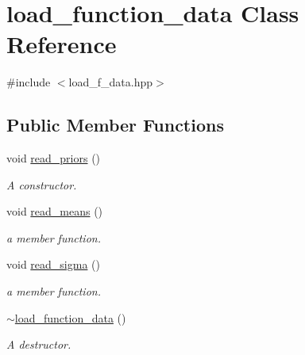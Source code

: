 \hypertarget{classload__function__data}{\section{load\-\_\-function\-\_\-data \-Class \-Reference}
\label{classload__function__data}
}


{\ttfamily \#include $<$load\-\_\-f\-\_\-data.\-hpp$>$}

\subsection*{\-Public \-Member \-Functions}
\begin{DoxyCompactItemize}
\item 
void \hyperlink{classload__function__data_a642d59527bc9b92f3a7133f286b2a586}{read\-\_\-priors} ()
\begin{DoxyCompactList}\small\item\em \-A constructor. \end{DoxyCompactList}\item 
\hypertarget{classload__function__data_a71a30364a1c8cb22ea6219d7738eb7bb}{void \hyperlink{classload__function__data_a71a30364a1c8cb22ea6219d7738eb7bb}{read\-\_\-means} ()}\label{classload__function__data_a71a30364a1c8cb22ea6219d7738eb7bb}

\begin{DoxyCompactList}\small\item\em a member function. \end{DoxyCompactList}\item 
\hypertarget{classload__function__data_af43ee0e56debf23d34079303eb62feb3}{void \hyperlink{classload__function__data_af43ee0e56debf23d34079303eb62feb3}{read\-\_\-sigma} ()}\label{classload__function__data_af43ee0e56debf23d34079303eb62feb3}

\begin{DoxyCompactList}\small\item\em a member function. \end{DoxyCompactList}\item 
\hyperlink{classload__function__data_a14146a95da58d70c196b76210809c2ed}{$\sim$load\-\_\-function\-\_\-data} ()
\begin{DoxyCompactList}\small\item\em \-A destructor. \end{DoxyCompactList}\end{DoxyCompactItemize}


